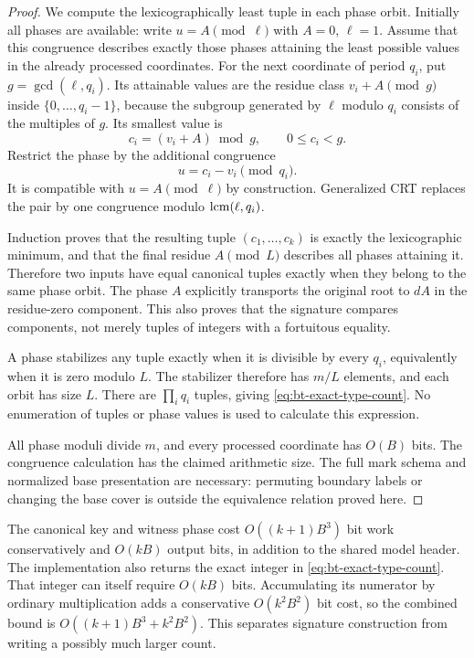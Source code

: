 \begin{proof}
We compute the lexicographically least tuple in each phase orbit.  Initially
all phases are available: write $u=A\pmod\ell$ with $A=0$, $\ell=1$.
Assume that this congruence describes exactly those phases attaining the
least possible values in the already processed coordinates.  For the next
coordinate of period $q_i$, put $g=\gcd(\ell,q_i)$.  Its attainable values
are the residue class $v_i+A\pmod g$ inside $\{0,\ldots,q_i-1\}$, because
the subgroup generated by $\ell$ modulo $q_i$ consists of the multiples
of $g$.  Its smallest value is
\begin{equation}\label{eq:bt-greedy-coordinate}
 c_i=(v_i+A)\bmod g,\qquad 0\le c_i<g.
\end{equation}
Restrict the phase by the additional congruence
\[
 u=c_i-v_i\pmod{q_i}.
\]
It is compatible with $u=A\pmod\ell$ by construction.  Generalized CRT
replaces the pair by one congruence modulo $\operatorname{lcm}(\ell,q_i)$.

Induction proves that the resulting tuple $(c_1,\ldots,c_k)$ is exactly
the lexicographic minimum, and that the final residue $A\pmod L$
describes all phases attaining it.  Therefore two inputs have equal
canonical tuples exactly when they belong to the same phase orbit.
The phase $A$ explicitly transports the original root to $dA$ in the
residue-zero component.  This also proves that the signature compares
components, not merely tuples of integers with a fortuitous equality.

A phase stabilizes any tuple exactly when it is divisible by every
$q_i$, equivalently when it is zero modulo $L$.  The stabilizer therefore
has $m/L$ elements, and each orbit has size $L$.  There are
$\prod_iq_i$ tuples, giving \eqref{eq:bt-exact-type-count}.  No enumeration
of tuples or phase values is used to calculate this expression.

All phase moduli divide $m$, and every processed coordinate has $O(B)$
bits.  The congruence calculation has the claimed arithmetic size.
The full mark schema and normalized base presentation are necessary:
permuting boundary labels or changing the base cover is outside the
equivalence relation proved here.
\end{proof}

The canonical key and witness phase cost $O((k+1)B^3)$ bit work
conservatively and $O(kB)$ output bits, in addition to the shared model
header.  The implementation also returns the exact integer in
\eqref{eq:bt-exact-type-count}.  That integer can itself require
$O(kB)$ bits.  Accumulating its numerator by ordinary multiplication
adds a conservative $O(k^2B^2)$ bit cost, so the combined bound is
$O((k+1)B^3+k^2B^2)$.  This separates signature construction from writing
a possibly much larger count.

